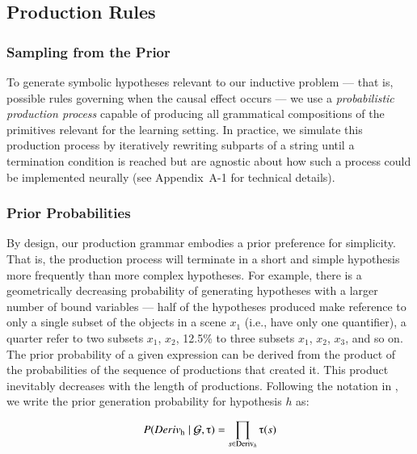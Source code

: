 \documentclass[doc,natbib,floatsintext]{apa7}
\begin{document}
\subsection{Production Rules}

\subsubsection{Sampling from the Prior}
To generate symbolic hypotheses relevant to our inductive problem --- that is, possible rules governing when the causal effect occurs --- we use a \emph{probabilistic production process} capable of producing all grammatical compositions of the primitives relevant for the learning setting. In practice, we simulate this production process by iteratively rewriting subparts of a string until a termination condition is reached \citep{manning1999foundations, goodman2008rational,piantadosi2016logical,bramley2018grounding} but are agnostic about how such a process could be implemented neurally (see Appendix~A-1 for technical details).


\subsubsection{Prior Probabilities}
By design, our production grammar embodies a prior preference for simplicity. That is, the production process will terminate in a short and simple hypothesis more frequently than more complex hypotheses. For example, there is a geometrically decreasing probability of generating hypotheses with a larger number of bound variables --- half of the hypotheses produced make reference to only a single subset of the objects in a scene $x_1$ (i.e., have only one quantifier), a quarter refer to two subsets $x_1$, $x_2$, 12.5\% to three subsets $x_1$, $x_2$, $x_3$, and so on. The prior probability of a given expression can be derived from the product of the probabilities of the sequence of productions that created it. This product inevitably decreases with the length of productions. Following the notation in \cite{goodman2008rational}, we write the prior generation probability for hypothesis \(h\) as:

\begin{equation}
    P(Deriv\textsubscript{h}\mid\mathcal{G},\tau) = \prod_{s\in \text{Deriv}_{h}} \tau(s)
\label{equ:equ_2_prior}
\end{equation} 
\end{document}
